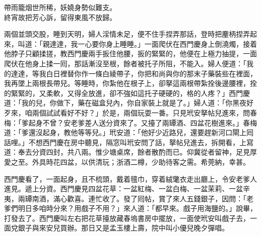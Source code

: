 \begin{myquote}
帶雨籠烟世所稀，妖嬈身勢似難支。\\終宵故把芳心訴，留得東風不放歸。
\end{myquote}

兩個並頭交股，睡到天明，婦人淫情未足，便不住手捏弄那話，登時把麈柄捏弄起來，叫道：「親達達，我一心要你身上睡睡。」一面爬伏在西門慶身上倒澆燭，接着他脖子只顧揉搓，教西門慶兩手扳住他腰，扳的緊緊的，他便在上極力抽提，一面爬伏在他身上揉一囘，那話漸沒至根，餘者被托子所阻，不能入。婦人便道：「我的達達，等我白日裡替你作一條白綾帶子，你把和尚與你的那末子藥裝些在裡面，我再墜上兩根長帶兒。等睡時，你紮他在根子上，卻拏這兩根帶紮拴後邊腰裡，拴的緊緊的，又柔軟，又得全放進，卻不強如這托子硬硬的，格的人疼？」{}西門慶道：「我的兒，你做下，藥在磁盒兒內，你自家裝上就是了。」婦人道：「你黑夜好歹來，咱兩個試試看好不好？」於是，兩個玩耍一番。只見玳安拏帖兒進來，問春梅：「爹起身不曾？安老爹差人送分資來了。又擡了兩罈酒、四盆花樹進來。」春梅道：「爹還沒起身，教他等等兒。」玳安道：「他好少近路兒，還要趕新河口閘上囘話哩。」不想西門慶在房中聽見，隔窓叫玳安問了話，拏帖兒進去，拆開看，上寫道：奉去分資四封，共八兩。惟少塘桌席，餘者散酌而已。仰冀從者留神，足見厚愛之至。外具時花四盆，以供清玩；浙酒二樽，少助待客之需。希莞納，幸甚。

西門慶看了，一面起身，且不梳頭，戴着氊巾，穿着絨氅衣走出廳上，令安老爹人進見。遞上分資。西門慶見四盆花草：一盆紅梅、一盆白梅、一盆茉莉、一盆辛夷，兩罈南酒，滿心歡喜。連忙收了。發了囘帖，賞了來人五錢銀子，因問：「老爹們明日多咱時分來？用戲子不用？」來人道：「都早來。戲子用海鹽的。」說畢，打發去了。西門慶叫左右把花草擡放藏春塢書房中擺放，一面使玳安叫戲子去，一面兌銀子與來安兒買辦。那日又是孟玉樓上壽，院中叫小優兒晚夕彈唱。

